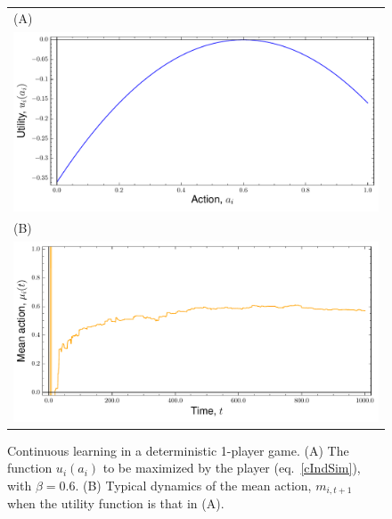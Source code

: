 \documentclass[11pt,reqno]{amsart}
\newcommand{\ac}{a} %
\newcommand{\tm}{t}%
\newcommand{\pf}{u} %
\newcommand{\ma}{m} %
\newcommand{\ba}{\beta} %
\begin{document}
\begin{figure}[h]
\begin{center}
\begin{tabular}{l}
  (A) \\
\includegraphics[scale=0.5]{simUf.pdf}\\
  (B) \\
 \includegraphics[scale=0.5]{meanDyn.pdf}\\
\end{tabular}
\caption{Continuous learning in a deterministic 1-player game. (A) The function $\pf_i(\ac_i)$ to be maximized by the player (eq.~\ref{cIndSim}), with $\ba=0.6$. (B) Typical dynamics of the mean action, $\ma_{i,\tm+1}$ when the utility function is that in (A).}
\label{simIndDyn}
\end{center}
\end{figure}
\end{document}
